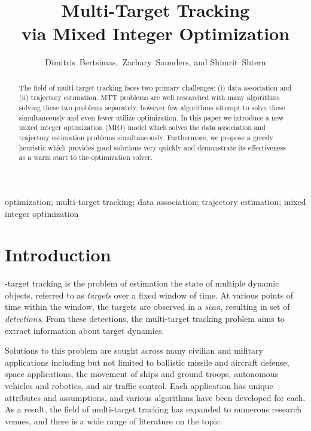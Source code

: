 \documentclass[journal]{IEEEtran}
\begin{document}
\title{Multi-Target Tracking\\ via Mixed Integer Optimization}


\author{Dimitris~Bertsimas,~Zachary~Saunders, and Shimrit~Shtern}

\maketitle

\begin{abstract}
The field of multi-target tracking faces two primary challenges: (i) data association and (ii) trajectory estimation. MTT problems are well researched with many algorithms solving these two problems separately, however few algorithms attempt to solve these simultaneously and even fewer utilize optimization. In this paper we introduce a new mixed integer optimization (MIO) model which solves the data association and trajectory estimation problems simultaneously. Furthermore, we propose a greedy heuristic which provides good solutions very quickly and demonstrate its effectiveness as a warm start to the optimization solver. 
\end{abstract}

\begin{IEEEkeywords}
optimization; multi-target tracking; data association; trajectory estimation; mixed integer optimization 
\end{IEEEkeywords}

\section{Introduction}

-target tracking is the problem of estimation the state of multiple dynamic objects, referred to as \textit{targets} over a fixed window of time. At various points of time within the window, the targets are observed in a \textit{scan}, resulting in set of \textit{detections}. From these detections, the multi-target tracking problem aims to extract information about target dynamics. 

Solutions to this problem are sought across many civilian and military applications including but not limited to ballistic missile and aircraft defense, space applications, the movement of ships and ground troops, autonomous vehicles and robotics, and air traffic control. Each application has unique attributes and assumptions, and various algorithms have been developed for each. As a result, the field of multi-target tracking has expanded to numerous research venues, and there is a wide range of literature on the topic.
\end{document}
